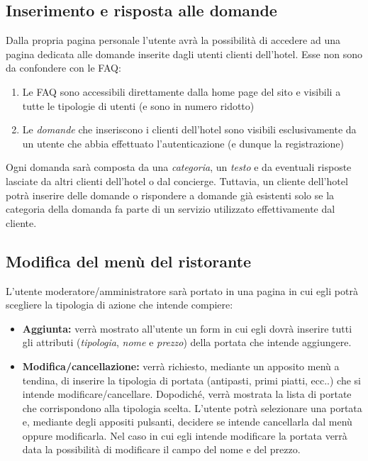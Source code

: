 \documentclass [a4paper, 12pt]{book}
\begin{document}
\medskip

\subsection{Inserimento e risposta alle domande}
Dalla propria pagina personale l'utente avrà la possibilità di accedere ad una pagina dedicata alle domande inserite dagli utenti clienti dell'hotel. Esse non sono da confondere con le FAQ:
\begin{enumerate}
\item Le FAQ sono accessibili direttamente dalla home page del sito e visibili a tutte le tipologie di utenti (e sono in numero ridotto)
\item Le \textit{domande} che inseriscono i clienti dell'hotel sono visibili esclusivamente da un utente che abbia effettuato l'autenticazione (e dunque la registrazione)
\end{enumerate}
Ogni domanda sarà composta da una \textit{categoria}, un \textit{testo} e da eventuali risposte lasciate da altri clienti dell'hotel o dal concierge. Tuttavia, un cliente dell'hotel potrà inserire delle domande o rispondere a domande già esistenti solo  se la categoria della domanda fa parte di un servizio utilizzato effettivamente dal cliente.


\subsection{Modifica del menù del ristorante}
\label{ModificaMenu}
L'utente moderatore/amministratore sarà portato in una pagina in cui egli potrà scegliere la tipologia di azione che intende compiere:
\begin{itemize}
\item \textbf{Aggiunta:} verrà mostrato all'utente un form in cui egli dovrà inserire tutti gli attributi (\textit{tipologia}, \textit{nome} e \textit{prezzo}) della portata che intende aggiungere.
\item \textbf{Modifica/cancellazione:} verrà richiesto, mediante un apposito menù a tendina, di inserire la tipologia di portata (antipasti, primi piatti, ecc..) che si intende modificare/cancellare. Dopodiché, verrà mostrata la lista di portate che corrispondono alla tipologia scelta. L'utente potrà selezionare una portata e, mediante degli appositi pulsanti, decidere se intende cancellarla dal menù oppure modificarla. Nel caso in cui egli intende modificare la portata verrà data la possibilità di modificare il campo del nome e del prezzo.
\end{itemize} 
\end{document}

